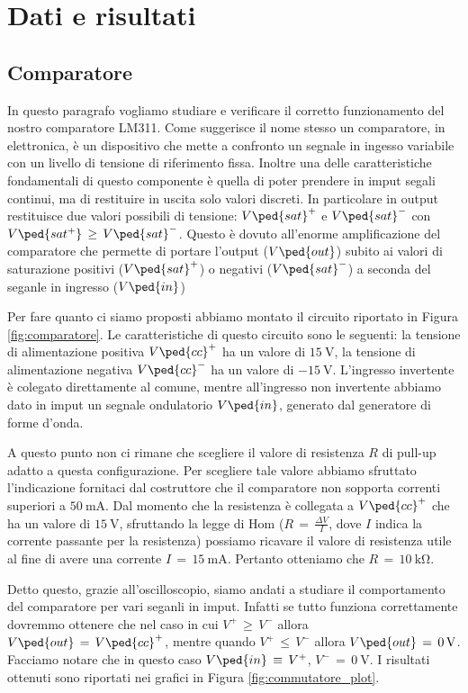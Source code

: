 \section*{Dati e risultati}

\subsection*{Comparatore}

In questo paragrafo vogliamo studiare e verificare il corretto funzionamento del nostro comparatore LM311. Come suggerisce il nome stesso un comparatore, in elettronica, è un dispositivo che mette a confronto un segnale in ingesso variabile con un livello di tensione di riferimento fissa. Inoltre una delle caratteristiche fondamentali di questo componente è quella di poter prendere in imput segali continui, ma di restituire in uscita solo valori discreti. In particolare in output restituisce due valori possibili di tensione: $V\ped{sat}^+$ e $V\ped{sat}^-$ con $V\ped{sat^+}\,\geq\,V\ped{sat}^-$. Questo è dovuto all'enorme amplificazione del comparatore che permette di portare l'output ($V\ped{out}$) subito ai valori di saturazione positivi ($V\ped{sat}^+$) o negativi ($V\ped{sat}^-$) a seconda del seganle in ingresso ($V\ped{in}$)

Per fare quanto ci siamo proposti abbiamo montato il circuito riportato in Figura \ref{fig:comparatore}. Le caratteristiche di questo circuito sono le seguenti: la tensione di alimentazione positiva $V\ped{cc}^+$ ha un valore di $\SI{+15}{\volt}$, la tensione di alimentazione negativa $V\ped{cc}^-$ ha un valore di $\SI{-15}{\volt}$. L'ingresso invertente è colegato direttamente al comune, mentre all'ingresso non invertente abbiamo dato in imput un segnale ondulatorio $V\ped{in}$, generato dal generatore di forme d'onda.

A questo punto non ci rimane che scegliere il valore di resistenza $R$ di pull-up adatto a questa configurazione. Per scegliere tale valore abbiamo sfruttato l'indicazione fornitaci dal costruttore che il comparatore non sopporta correnti superiori a $\SI{50}{\milli\ampere}$. Dal momento che la resistenza è collegata a $V\ped{cc}^+$ che ha un valore di $\SI{+15}{\volt}$, sfruttando la legge di Hom ($R\,=\,\frac{\Delta V}{I}$, dove $I$ indica la corrente passante per la resistenza) possiamo ricavare il valore di resistenza utile al fine di avere una corrente $I\,=\,\SI{15}{\milli\ampere}$. Pertanto otteniamo che $R\,=\,\SI{10}{\kilo\ohm}$.

Detto questo, grazie all'oscilloscopio, siamo andati a studiare il comportamento del comparatore per vari seganli in imput. Infatti se tutto funziona correttamente dovremmo ottenere che nel caso in cui $V^+\,\geq\,V^-$ allora $V\ped{out}\,=\,V\ped{cc}^+$, mentre quando $V^+\,\leq\,V^-$ allora $V\ped{out}\,=\,\SI{0}{\volt}$. Facciamo notare che in questo caso $V\ped{in}\,\equiv\,V^+$, $V^-\,=\,\SI{0}{\volt}$. I risultati ottenuti sono riportati nei grafici in Figura \ref{fig:commutatore_plot}.

